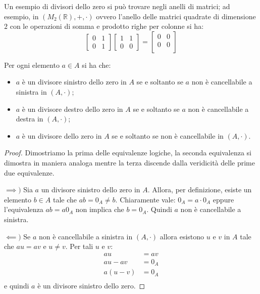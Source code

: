 \begin{example}
	Un esempio di divisori dello zero si può trovare negli anelli di matrici; ad esempio, in $(M_{2}(\mathbb{R}),+,\cdot)$ ovvero l'anello delle matrici quadrate di dimensione $2$ con le operazioni di somma e prodotto righe per colonne si ha:
	\begin{displaymath}
		\begin{bmatrix}
			0 & 1 \\
			0 & 1
		\end{bmatrix}
		\begin{bmatrix}
			1 & 1 \\
			0 & 0
		\end{bmatrix}
		=
		\begin{bmatrix}
			0 & 0 \\
			0 & 0 \\
		\end{bmatrix}
	\end{displaymath}
\end{example}

\begin{teorbox}\label{thm:car_divisori_zero}
	Per ogni elemento $a \in A$ si ha che:
	\begin{itemize}
		\item $a$ è un divisore sinistro dello zero in $A$ se e soltanto se $a$ non è cancellabile a sinistra in $(A, \cdot)$;
		\item $a$ è un divisore destro dello zero in $A$ se e soltanto se $a$ non è cancellabile a destra in $(A, \cdot)$;
		\item $a$ è un divisore dello zero in $A$ se e soltanto se non è cancellabile in $(A,\cdot)$.
	\end{itemize}
	
\end{teorbox}

\begin{proof}
	Dimostriamo la prima delle equivalenze logiche, la seconda equivalenza si dimostra in maniera analoga mentre la terza discende dalla veridicità delle prime due equivalenze.
	
	$\implies)$ Sia $a$ un divisore sinistro dello zero in $A$. Allora, per definizione, esiste un elemento $b \in A$ tale che $ab=0_{A} \neq b$.  Chiaramente vale: $0_{A}= a \cdot 0_{A}$ eppure l'equivalenza $ab=a0_{A}$ non implica che $b = 0_{A}$. Quindi $a$ non è cancellabile a sinistra.
	
	$\impliedby)$ Se $a$ non è cancellabile a sinistra in $(A,\cdot)$ allora esistono $u$ e $v$ in $A$ tale che $au=av$ e $u \neq v$. Per tali $u$ e $v$:
	\begin{align*}
		au &= av\\
		au - av &= 0_{A}\\
		a(u-v) &= 0_{A}\\
	\end{align*}
	e quindi $a$ è un divisore sinistro dello zero.
\end{proof}


